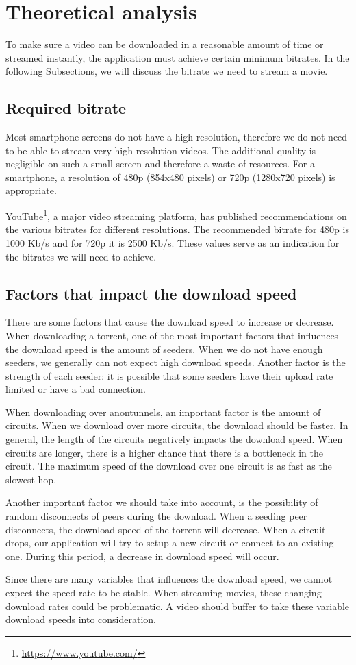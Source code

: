 \section{Theoretical analysis}
\label{sec:experiments:theoretical}
	To make sure a video can be downloaded in a reasonable amount of time or streamed instantly, the application must achieve certain minimum bitrates. In the following Subsections, we will discuss the bitrate we need to stream a movie.
	
	\subsection{Required bitrate}
	\label{sec:experiments:theoretical:bitrates}
		Most smartphone screens do not have a high resolution, therefore we do not need to be able to stream very high resolution videos. The additional quality is negligible on such a small screen and therefore a waste of resources. For a smartphone, a resolution of 480p (854x480 pixels) or 720p (1280x720 pixels) is appropriate.
		
		YouTube\footnote{\url{https://www.youtube.com/}}, a major video streaming platform, has published recommendations on the various bitrates for different resolutions\cite{googlebitrates}. The recommended bitrate for 480p is 1000 Kb/s and for 720p it is 2500 Kb/s. These values serve as an indication for the bitrates we will need to achieve. 
		
	\subsection{Factors that impact the download speed}
		There are some factors that cause the download speed to increase or decrease. When downloading a torrent, one of the most important factors that influences the download speed is the amount of seeders. When we do not have enough seeders, we generally can not expect high download speeds. Another factor is the strength of each seeder: it is possible that some seeders have their upload rate limited or have a bad connection.
		
		When downloading over anontunnels, an important factor is the amount of circuits. When we download over more circuits, the download should be faster. In general, the length of the circuits negatively impacts the download speed. When circuits are longer, there is a higher chance that there is a bottleneck in the circuit. The maximum speed of the download over one circuit is as fast as the slowest hop.
		
		Another important factor we should take into account, is the possibility of random disconnects of peers during the download. When a seeding peer disconnects, the download speed of the torrent will decrease. When a circuit drops, our application will try to setup a new circuit or connect to an existing one. During this period, a decrease in download speed will occur.
		
		Since there are many variables that influences the download speed, we cannot expect the speed rate to be stable. When streaming movies, these changing download rates could be problematic. A video should buffer to take these variable download speeds into consideration.